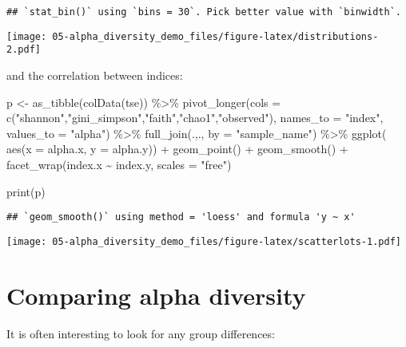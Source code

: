 \documentclass[
  oneside]{book}
\newenvironment{Shaded}{\begin{snugshade}}{\end{snugshade}}
\newcommand{\AttributeTok}[1]{\textcolor[rgb]{0.77,0.63,0.00}{#1}}
\newcommand{\FunctionTok}[1]{\textcolor[rgb]{0.00,0.00,0.00}{#1}}
\newcommand{\NormalTok}[1]{#1}
\newcommand{\OtherTok}[1]{\textcolor[rgb]{0.56,0.35,0.01}{#1}}
\newcommand{\SpecialCharTok}[1]{\textcolor[rgb]{0.00,0.00,0.00}{#1}}
\newcommand{\StringTok}[1]{\textcolor[rgb]{0.31,0.60,0.02}{#1}}
\begin{document}
\begin{verbatim}
## `stat_bin()` using `bins = 30`. Pick better value with `binwidth`.
\end{verbatim}

\texttt{[image: 05-alpha\_diversity\_demo\_files/figure-latex/distributions-2.pdf]}

and the correlation between indices:

\begin{Shaded}
\begin{Highlighting}[]
\NormalTok{p }\OtherTok{\textless{}{-}} \FunctionTok{as\_tibble}\NormalTok{(}\FunctionTok{colData}\NormalTok{(tse)) }\SpecialCharTok{\%\textgreater{}\%} 
  \FunctionTok{pivot\_longer}\NormalTok{(}\AttributeTok{cols =} \FunctionTok{c}\NormalTok{(}\StringTok{"shannon"}\NormalTok{,}\StringTok{"gini\_simpson"}\NormalTok{,}\StringTok{"faith"}\NormalTok{,}\StringTok{"chao1"}\NormalTok{,}\StringTok{"observed"}\NormalTok{), }\AttributeTok{names\_to =} \StringTok{"index"}\NormalTok{, }\AttributeTok{values\_to =} \StringTok{"alpha"}\NormalTok{) }\SpecialCharTok{\%\textgreater{}\%} 
  \FunctionTok{full\_join}\NormalTok{(.,., }\AttributeTok{by =} \StringTok{"sample\_name"}\NormalTok{) }\SpecialCharTok{\%\textgreater{}\%} 
  \FunctionTok{ggplot}\NormalTok{( }\FunctionTok{aes}\NormalTok{(}\AttributeTok{x =}\NormalTok{ alpha.x, }\AttributeTok{y =}\NormalTok{ alpha.y)) }\SpecialCharTok{+} 
  \FunctionTok{geom\_point}\NormalTok{() }\SpecialCharTok{+}
  \FunctionTok{geom\_smooth}\NormalTok{() }\SpecialCharTok{+}
  \FunctionTok{facet\_wrap}\NormalTok{(index.x }\SpecialCharTok{\textasciitilde{}}\NormalTok{ index.y, }\AttributeTok{scales =} \StringTok{"free"}\NormalTok{)}

\FunctionTok{print}\NormalTok{(p)}
\end{Highlighting}
\end{Shaded}

\begin{verbatim}
## `geom_smooth()` using method = 'loess' and formula 'y ~ x'
\end{verbatim}

\texttt{[image: 05-alpha\_diversity\_demo\_files/figure-latex/scatterlots-1.pdf]}

\hypertarget{comparing-alpha-diversity}{%
\section{Comparing alpha diversity}\label{comparing-alpha-diversity}}

It is often interesting to look for any group differences:
\end{document}
